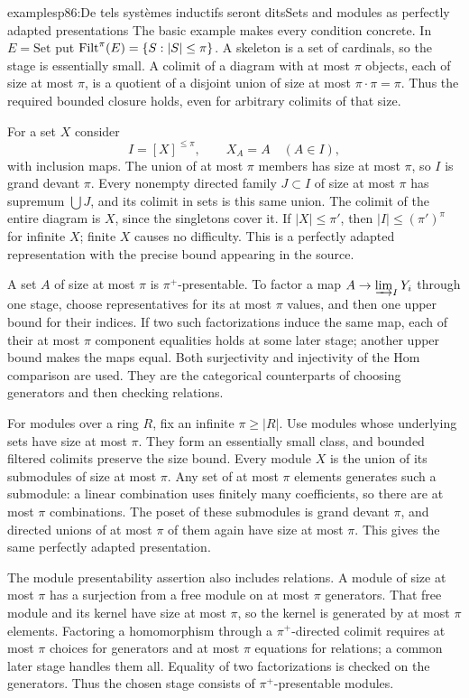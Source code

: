 \begin{dcomment}{examples}{p86:De tels systèmes inductifs seront dits}{Sets and modules as perfectly adapted presentations}
The basic example makes every condition concrete. In $E=\mathrm{Set}$ put $\mathrm{Filt}^\pi(E)=\{S:|S|\leq\pi\}$. A skeleton is a set of cardinals, so the stage is essentially small. A colimit of a diagram with at most $\pi$ objects, each of size at most $\pi$, is a quotient of a disjoint union of size at most $\pi\cdot\pi=\pi$. Thus the required bounded closure holds, even for arbitrary colimits of that size.

For a set $X$ consider
\[
 I=[X]^{\leq\pi},\qquad X_A=A\quad(A\in I),
\]
with inclusion maps. The union of at most $\pi$ members has size at most $\pi$, so $I$ is grand devant $\pi$. Every nonempty directed family $J\subset I$ of size at most $\pi$ has supremum $\bigcup J$, and its colimit in sets is this same union. The colimit of the entire diagram is $X$, since the singletons cover it. If $|X|\leq\pi'$, then $|I|\leq(\pi')^\pi$ for infinite $X$; finite $X$ causes no difficulty. This is a perfectly adapted representation with the precise bound appearing in the source.

A set $A$ of size at most $\pi$ is $\pi^+$-presentable. To factor a map $A\to\varinjlim_IY_i$ through one stage, choose representatives for its at most $\pi$ values, and then one upper bound for their indices. If two such factorizations induce the same map, each of their at most $\pi$ component equalities holds at some later stage; another upper bound makes the maps equal. Both surjectivity and injectivity of the Hom comparison are used. They are the categorical counterparts of choosing generators and then checking relations.

For modules over a ring $R$, fix an infinite $\pi\geq|R|$. Use modules whose underlying sets have size at most $\pi$. They form an essentially small class, and bounded filtered colimits preserve the size bound. Every module $X$ is the union of its submodules of size at most $\pi$. Any set of at most $\pi$ elements generates such a submodule: a linear combination uses finitely many coefficients, so there are at most $\pi$ combinations. The poset of these submodules is grand devant $\pi$, and directed unions of at most $\pi$ of them again have size at most $\pi$. This gives the same perfectly adapted presentation.

The module presentability assertion also includes relations. A module of size at most $\pi$ has a surjection from a free module on at most $\pi$ generators. That free module and its kernel have size at most $\pi$, so the kernel is generated by at most $\pi$ elements. Factoring a homomorphism through a $\pi^+$-directed colimit requires at most $\pi$ choices for generators and at most $\pi$ equations for relations; a common later stage handles them all. Equality of two factorizations is checked on the generators. Thus the chosen stage consists of $\pi^+$-presentable modules.


\end{dcomment}
